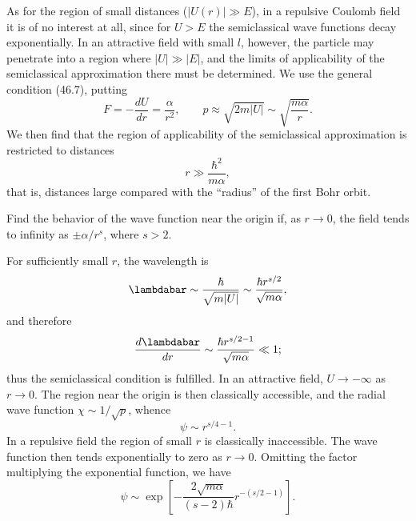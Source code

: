 As for the region of small distances ($|U(r)|\gg E$), in a repulsive Coulomb
field it is of no interest at all, since for $U>E$ the semiclassical wave
functions decay exponentially. In an attractive field with small $l$, however,
the particle may penetrate into a region where $|U|\gg|E|$, and the limits of
applicability of the semiclassical approximation there must be determined. We
use the general condition (46.7), putting
\[
  F=-\frac{dU}{dr}=\frac{\alpha}{r^2},\qquad
  p\approx\sqrt{2m|U|}\sim\sqrt{\frac{m\alpha}{r}}.
\]
We then find that the region of applicability of the semiclassical
approximation is restricted to distances
\begin{equation}
  r\gg\frac{\hbar^2}{m\alpha},
  \tag{49.12}
\end{equation}
that is, distances large compared with the ``radius'' of the first Bohr orbit.

\ProblemHeading

Find the behavior of the wave function near the origin if, as $r\to0$, the
field tends to infinity as $\pm\alpha/r^s$, where $s>2$.

\SolutionHeading For sufficiently small $r$, the wavelength is
\[
  \lambdabar\sim\frac{\hbar}{\sqrt{m|U|}}
  \sim\frac{\hbar r^{s/2}}{\sqrt{m\alpha}},
\]
and therefore
\[
  \frac{d\lambdabar}{dr}\sim
  \frac{\hbar r^{s/2-1}}{\sqrt{m\alpha}}\ll1;
\]
thus the semiclassical condition is fulfilled. In an attractive field,
$U\to-\infty$ as $r\to0$. The region near the origin is then classically
accessible, and the radial wave function $\chi\sim1/\sqrt p$, whence
\[
  \psi\sim r^{s/4-1}.
\]
In a repulsive field the region of small $r$ is classically inaccessible. The
wave function then tends exponentially to zero as $r\to0$. Omitting the factor
multiplying the exponential function, we have
\[
  \psi\sim\exp\left[-\frac{2\sqrt{m\alpha}}{(s-2)\hbar}
  r^{-(s/2-1)}\right].
\]
